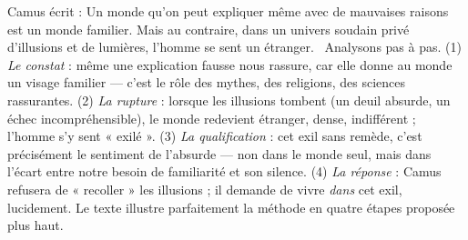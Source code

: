 \documentclass[11pt]{article}
\begin{document}
\begin{experience}
Camus écrit : \guillemotleft Un monde qu'on peut expliquer même avec de mauvaises raisons est un monde familier. Mais au contraire, dans un univers soudain privé d'illusions et de lumières, l'homme se sent un étranger. \guillemotright\ Analysons pas à pas. (1) \emph{Le constat} : même une explication fausse nous rassure, car elle donne au monde un visage familier — c'est le rôle des mythes, des religions, des sciences rassurantes. (2) \emph{La rupture} : lorsque les illusions tombent (un deuil absurde, un échec incompréhensible), le monde redevient étranger, dense, indifférent ; l'homme s'y sent « exilé ». (3) \emph{La qualification} : cet exil sans remède, c'est précisément le sentiment de l'absurde — non dans le monde seul, mais dans l'écart entre notre besoin de familiarité et son silence. (4) \emph{La réponse} : Camus refusera de « recoller » les illusions ; il demande de vivre \emph{dans} cet exil, lucidement. Le texte illustre parfaitement la méthode en quatre étapes proposée plus haut.
\end{experience}
\end{document}
